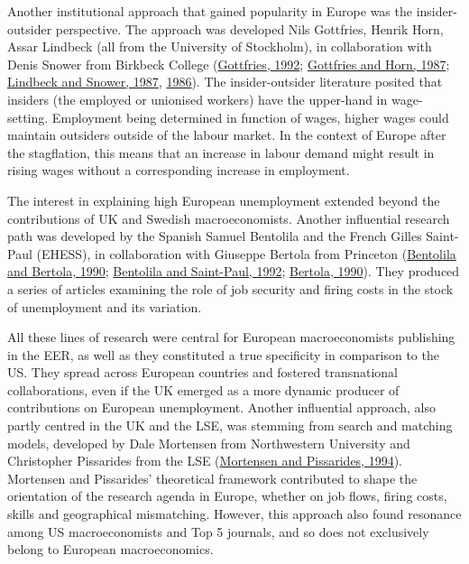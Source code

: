 \documentclass[
  12pt,
  onecolumn]{article}
\begin{document}
Another institutional approach that gained popularity in Europe was the insider-outsider perspective. The approach was developed Nils Gottfries, Henrik Horn, Assar Lindbeck (all from the University of Stockholm), in collaboration with Denis Snower from Birkbeck College (\protect\hyperlink{ref-gottfries1992}{Gottfries, 1992}; \protect\hyperlink{ref-gottfries1987}{Gottfries and Horn, 1987}; \protect\hyperlink{ref-lindbeck1987a}{Lindbeck and Snower, 1987}, \protect\hyperlink{ref-lindbeck1986}{1986}). The insider-outsider literature posited that insiders (the employed or unionised workers) have the upper-hand in wage-setting. Employment being determined in function of wages, higher wages could maintain outsiders outside of the labour market. In the context of Europe after the stagflation, this means that an increase in labour demand might result in rising wages without a corresponding increase in employment.

The interest in explaining high European unemployment extended beyond the contributions of UK and Swedish macroeconomists. Another influential research path was developed by the Spanish Samuel Bentolila and the French Gilles Saint-Paul (EHESS), in collaboration with Giuseppe Bertola from Princeton (\protect\hyperlink{ref-bentolila1990}{Bentolila and Bertola, 1990}; \protect\hyperlink{ref-bentolila1992a}{Bentolila and Saint-Paul, 1992}; \protect\hyperlink{ref-bertola1990a}{Bertola, 1990}). They produced a series of articles examining the role of job security and firing costs in the stock of unemployment and its variation.

All these lines of research were central for European macroeconomists publishing in the EER, as well as they constituted a true specificity in comparison to the US. They spread across European countries and fostered transnational collaborations, even if the UK emerged as a more dynamic producer of contributions on European unemployment. Another influential approach, also partly centred in the UK and the LSE, was stemming from search and matching models, developed by Dale Mortensen from Northwestern University and Christopher Pissarides from the LSE (\protect\hyperlink{ref-mortensen1994}{Mortensen and Pissarides, 1994}). Mortensen and Pissarides' theoretical framework contributed to shape the orientation of the research agenda in Europe, whether on job flows, firing costs, skills and geographical mismatching. However, this approach also found resonance among US macroeconomists and Top 5 journals, and so does not exclusively belong to European macroeconomics.
\end{document}
